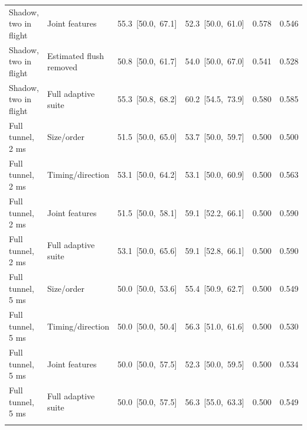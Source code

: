 \begin{table}[htbp]
\begin{tabular}{llrrrr}
Shadow, two in flight & Joint features & \mbox{55.3 [50.0, 67.1]} & \mbox{52.3 [50.0, 61.0]} & 0.578 & 0.546 \\
Shadow, two in flight & Estimated flush removed & \mbox{50.8 [50.0, 61.7]} & \mbox{54.0 [50.0, 67.0]} & 0.541 & 0.528 \\
Shadow, two in flight & Full adaptive suite & \mbox{55.3 [50.8, 68.2]} & \mbox{60.2 [54.5, 73.9]} & 0.580 & 0.585 \\
\addlinespace[2pt]
Full tunnel, 2 ms & Size/order & \mbox{51.5 [50.0, 65.0]} & \mbox{53.7 [50.0, 59.7]} & 0.500 & 0.500 \\
Full tunnel, 2 ms & Timing/direction & \mbox{53.1 [50.0, 64.2]} & \mbox{53.1 [50.0, 60.9]} & 0.500 & 0.563 \\
Full tunnel, 2 ms & Joint features & \mbox{51.5 [50.0, 58.1]} & \mbox{59.1 [52.2, 66.1]} & 0.500 & 0.590 \\
Full tunnel, 2 ms & Full adaptive suite & \mbox{53.1 [50.0, 65.6]} & \mbox{59.1 [52.8, 66.1]} & 0.500 & 0.590 \\
\addlinespace[2pt]
Full tunnel, 5 ms & Size/order & \mbox{50.0 [50.0, 53.6]} & \mbox{55.4 [50.9, 62.7]} & 0.500 & 0.549 \\
Full tunnel, 5 ms & Timing/direction & \mbox{50.0 [50.0, 50.4]} & \mbox{56.3 [51.0, 61.6]} & 0.500 & 0.530 \\
Full tunnel, 5 ms & Joint features & \mbox{50.0 [50.0, 57.5]} & \mbox{52.3 [50.0, 59.5]} & 0.500 & 0.534 \\
Full tunnel, 5 ms & Full adaptive suite & \mbox{50.0 [50.0, 57.5]} & \mbox{56.3 [55.0, 63.3]} & 0.500 & 0.549 \\
\addlinespace[2pt]
\bottomrule\end{tabular}
\end{table}
\clearpage
